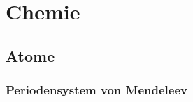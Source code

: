 \chapter{Chemie}
\section{Atome}

\newpage
\subsection{Periodensystem von Mendeleev}

\newcommand{\CommonElementTextFormat}[5]
{
	\begin{minipage}{2.2cm}
	\centering
	{\textbf{#1} \hfill #2}%
	\linebreak \linebreak
	{\textbf{#3}}%
	\linebreak
	{{#4}} %
	\linebreak
	{{#5} \hfill { }}
	\end{minipage}
}

\newcommand{\NaturalElementTextFormat}[5]
{
	\CommonElementTextFormat{#1}{#2}{\LARGE {#3}}{#4}{#5}
}

\newcommand{\OutlineText}[1]
{
		\pdfliteral direct {0.5 w 1 Tr}{#1}%
		\pdfliteral direct {1 w 0 Tr}%
}

\newcommand{\SyntheticElementTextFormat}[5]
{
	\CommonElementTextFormat{#1}{#2}{\OutlineText{\LARGE #3}}{#4}{#5}
}

